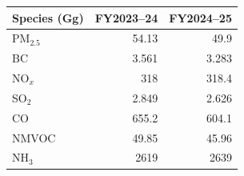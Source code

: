 \begin{tabular}{@{}lrr@{}}\toprule
Species (Gg) & FY2023--24 & FY2024--25\\\midrule
PM$_{2.5}$ & 54.13 & 49.9 \\
BC & 3.561 & 3.283 \\
NO$_x$ & 318 & 318.4 \\
SO$_2$ & 2.849 & 2.626 \\
CO & 655.2 & 604.1 \\
NMVOC & 49.85 & 45.96 \\
NH$_3$ & 2619 & 2639 \\
\bottomrule\end{tabular}
